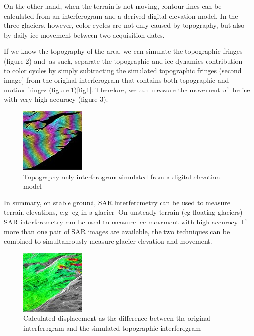 \documentclass[a4paper,12pt]{report}
\begin{document}
On the other hand, when the terrain is not moving, contour lines can be calculated from an interferogram and a derived digital elevation model. In the three glaciers, however, color cycles are not only caused by topography, but also by daily ice movement between two acquisition dates.

If we know the topography of the area, we can simulate the topographic fringes (figure 2) and, as such, separate the topographic and ice dynamics contribution to color cycles by simply subtracting the simulated topographic fringes (second image) from the original interferogram that contains both topographic and motion fringes (figure 1)\ref{fig1}. Therefore, we can measure the movement of the ice with very high accuracy (figure 3).
\begin{figure}[H]
	\begin{center}
	\includegraphics[scale=1]{fig3}
	\caption{Topography-only interferogram simulated from a digital elevation model}
	\end{center}
	\end{figure}
In summary, on stable ground, SAR interferometry can be used to measure terrain elevations, e.g. eg in a glacier. On unsteady terrain (eg floating glaciers) SAR interferometry can be used to measure ice movement with high accuracy. If more than one pair of SAR images are available, the two techniques can be combined to simultaneously measure glacier elevation and movement.
\begin{figure}[H]
	\begin{center}
	\includegraphics[scale=1]{fig4}
	\caption{Calculated displacement as the difference between the original interferogram and the simulated topographic interferogram}
	\end{center}
	\end{figure}
	
\end{document}

